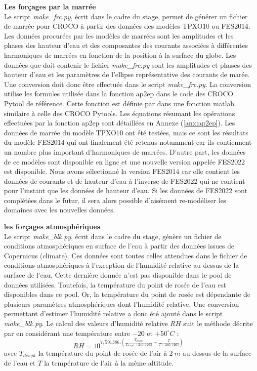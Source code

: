 \documentclass[10pt,a4paper,titlepage]{article}
\begin{document}
\textbf{Les forçages par la marrée}\\
\label{par:forcages_marree}
Le script \textit{make\_frc.py}, écrit dans le cadre du stage, permet de générer un fichier de marrée pour CROCO à partir des données des modèles TPXO10 ou FES2014.
Les données procurées par les modèles de marrées sont les amplitudes et les phases des hauteur d'eau et des composantes des courants associées à différentes harmoniques de marrées en fonction de la position à la surface du globe.
Les données que doit contenir le fichier \textit{make\_frc.py} sont les amplitudes et phases des hauteur d'eau et les paramètres de l'ellipse représentative des courants de marée.
Une conversion doit donc être effectuée dans le script \textit{make\_frc.py}.
La conversion utilise les formules utilisée dans la fonction ap2ep dans le code des CROCO Pytool de référence.
Cette fonction est définie par \cite[Zhigang Xu (2002)][]{ap2ep} dans une fonction matlab similaire à celle des CROCO Pytools.
Les équations résumant les opérations effectuées par la fonction ap2ep sont détaillées en Annexe (\ref{anx:ap2ep}).
Les données de marrée du modèle TPXO10 ont été testées, mais ce sont les résultats du modèle FES2014 qui ont finalement été retenus notamment car ils contiennent un nombre plus important d'harmoniques de marrées.
D'autre part, les données de ce modèles sont disponible en ligne et une nouvelle version appelée FES2022 est disponible.
Nous avons sélectionné la version FES2014 car elle contient les données de courants et de hauteur d'eau à l'inverse de FES2022 qui ne contient pour l'instant que les données de hauteur d'eau.
Si les données de FES2022 sont complétées dans le futur, il sera alors possible d'aisément re-modéliser les domaines avec les nouvelles données.

\textbf{les forçages atmosphériques}\\
\label{par:forcages_atm}
Le script \textit{make\_blk.py}, écrit dans le cadre du stage, génère un fichier de conditions atmosphériques en surface de l'eau à partir des données issues de Copernicus (climate).
Ces données sont toutes celles attendues dans le fichier de conditions atmosphériques à l'exception de l'humidité relative au dessus de la surface de l'eau. Cette dernière donnée n'est pas disponible dans le pool de données utilisées.
Toutefois, la température du point de rosée de l'eau est disponibles dans ce pool.
Or, la température du point de rosée est dépendante de plusieurs paramètres atmosphériques dont l'humidité relative.
Une conversion permettant d'estimer l'humidité relative a donc été ajouté dans le script \textit{make\_blk.py}.
Le calcul des valeurs d'humidité relative $RH$ suit le méthode décrite par \cite{humidity_formulation} en considérant une température entre $-20$ et $+50 ^\circ C$ :
$$RH = 10^{7,591386.(\frac{T_{dewpt}}{T_{dewpt}+240,7263}-\frac{T}{T+240,7263})}$$
avec $T_{dewpt}$ la température du point de rosée de l'air à $2~m$ au dessus de la surface de l'eau et $T$ la température de l'air à la même altitude.
\end{document}
